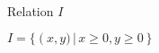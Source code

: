 {
\begin{center}
\\
Relation $I$
\end{center}
}
{$I = \{ \left(x,y) \, | \, x \geq 0, \! y \geq 0\right\}$}